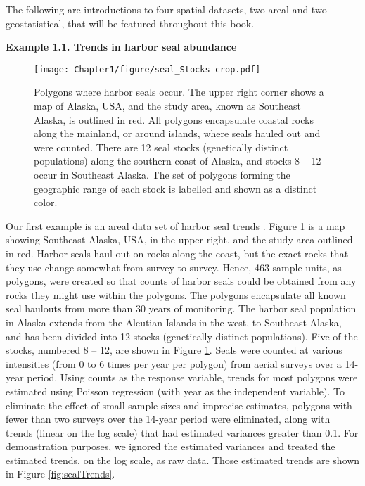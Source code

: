 The following are introductions to four spatial datasets, two areal and two geostatistical, that will be featured throughout this book.
\vspace{.25in}
\newline
\begin{tcolorbox}
{\bf Example 1.1.  Trends in harbor seal abundance}
\end{tcolorbox}
\vspace{.1in}
\begin{figure}
\begin{center}
\texttt{[image: Chapter1/figure/seal\_Stocks-crop.pdf]}
\caption{Polygons where harbor seals occur. The upper right corner shows a map of Alaska, USA, and the study area, known as Southeast Alaska, is outlined in red. All polygons encapsulate coastal rocks along the mainland, or around islands, where seals hauled out and were counted.  There are 12 seal stocks (genetically distinct populations) along the southern coast of Alaska, and stocks 8 -- 12 occur in Southeast Alaska.  The set of polygons forming the geographic range of each stock is labelled and shown as a distinct color.
\label{fig:sealStocks}}
\end{center}
\end{figure}
%
Our first example is an areal data set of harbor seal trends \citep{ver2018spatial}. Figure \ref{fig:sealStocks} is a map showing Southeast Alaska, USA, in the upper right, and the study area outlined in red. Harbor seals haul out on rocks along the coast, but the exact rocks that they use change somewhat from survey to survey. Hence, 463 sample units, as polygons, were created so that counts of harbor seals could be obtained from any rocks they might use within the polygons. The polygons encapsulate all known seal haulouts from more than 30 years of monitoring.  The harbor seal population in Alaska extends from the Aleutian Islands in the west, to Southeast Alaska, and has been divided into 12 stocks (genetically distinct populations).  Five of the stocks, numbered 8 -- 12, are shown in Figure \ref{fig:sealStocks}. Seals were counted at various intensities (from 0 to 6 times per year per polygon) from aerial surveys over a 14-year period. Using counts as the response variable, trends for most polygons were estimated using Poisson regression (with year as the independent variable). To eliminate the effect of small sample sizes and imprecise estimates, polygons with fewer than two surveys over the 14-year period were eliminated, along with trends (linear on the log scale) that had estimated variances greater than 0.1. For demonstration purposes, we ignored the estimated variances and treated the estimated trends, on the log scale, as raw data.  Those estimated trends are shown in Figure \ref{fig:sealTrends}.
